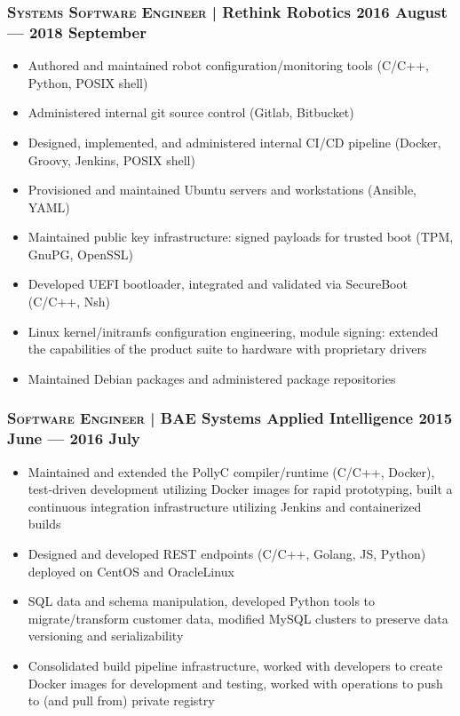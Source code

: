 \documentclass[letterpaper,10pt]{article}
\begin{document}
\subsubsection*{\textsc{Systems Software Engineer} | Rethink Robotics \hfill 2016 August --- 2018 September}

\begin{itemize}

\item
  Authored and maintained robot configuration/monitoring tools (C/C++, Python,
  POSIX shell)
\item
  Administered internal git source control (Gitlab, Bitbucket)
\item
  Designed, implemented, and administered internal CI/CD pipeline (Docker,
  Groovy, Jenkins, POSIX shell)
\item
  Provisioned and maintained Ubuntu servers and workstations (Ansible, YAML)
\item
  Maintained public key infrastructure: signed payloads for trusted boot (TPM,
  GnuPG, OpenSSL)
\item
  Developed UEFI bootloader, integrated and validated via SecureBoot (C/C++,
  Nsh)
\item
  Linux kernel/initramfs configuration engineering, module signing: extended
  the capabilities of the product suite to hardware with proprietary drivers
\item
  Maintained Debian packages and administered package repositories

\end{itemize}



\subsubsection*{\textsc{Software Engineer} | BAE Systems Applied Intelligence \hfill 2015 June --- 2016 July}

\begin{itemize}

\item
  Maintained and extended the PollyC compiler/runtime (C/C++, Docker),
  test-driven development utilizing Docker images for rapid prototyping, built
  a continuous integration infrastructure utilizing Jenkins and containerized
  builds
\item
  Designed and developed REST endpoints (C/C++, Golang, JS, Python) deployed on
  CentOS and OracleLinux
\item
  SQL data and schema manipulation, developed Python tools to migrate/transform
  customer data, modified MySQL clusters to preserve data versioning and
  serializability
\item
  Consolidated build pipeline infrastructure, worked with developers to create
  Docker images for development and testing, worked with operations to push to
  (and pull from) private registry

\end{itemize}
\end{document}
